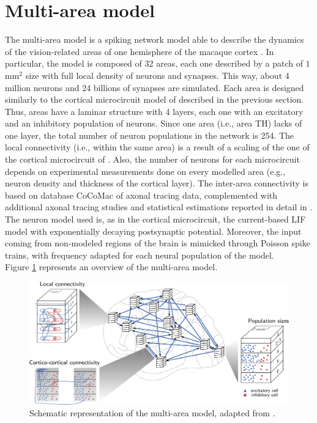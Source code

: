 \documentclass[a4paper, 12pt, twoside, openright]{book}
\begin{document}
\section{Multi-area model}
\label{sec:mam_description}
The multi-area model is a spiking network model able to describe the dynamics of the vision-related areas of one hemisphere of the macaque cortex \cite{Schmidt2018,Schmidt2018b}. In particular, the model is composed of 32 areas, each one described by a patch of $1$\,mm$^2$ size with full local density of neurons and synapses. This way, about 4 million neurons and 24 billions of synapses are simulated. Each area is designed similarly to the cortical microcircuit model of \cite{Potjans2012} described in the previous section. Thus, areas have a laminar structure with 4 layers, each one with an excitatory and an inhibitory population of neurons. Since one area (i.e., area TH) lacks of one layer, the total number of neuron populations in the network is 254. The local connectivity (i.e., within the same area) is a result of a scaling of the one of the cortical microcircuit of \cite{Potjans2012}. Also, the number of neurons for each microcircuit depends on experimental measurements done on every modelled area (e.g., neuron density and thickness of the cortical layer). The inter-area connectivity is based on database CoCoMac \cite{Bakker2012} of axonal tracing data, complemented with additional axonal tracing studies \cite{Markov2011,Markov2014} and statistical estimations reported in detail in \cite{Schuecker2017}.\\
The neuron model used is, as in the cortical microcircuit, the current-based LIF model with exponentially decaying postsynaptic potential. Moreover, the input coming from non-modeled regions of the brain is mimicked through Poisson spike trains, with frequency adapted for each neural population of the model.\\
Figure \ref{fig:mam} represents an overview of the multi-area model.
\begin{figure}[H]
    \centering
    \includegraphics[width=\columnwidth]{figures/multiarea.png}
    \caption{Schematic representation of the multi-area model, adapted from \cite{Tiddia2022}.}
    \label{fig:mam}
\end{figure}
\end{document}
